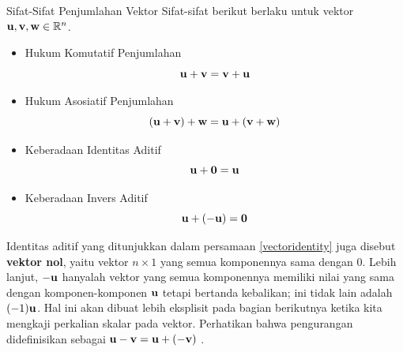 \begin{theorem}{Sifat-Sifat Penjumlahan Vektor}\label{thm:propertiesvectoraddition}
Sifat-sifat berikut berlaku untuk vektor $\mathbf{u},\mathbf{v}, \mathbf{w} \in \mathbb{R}^{n}$.
\begin{itemize}
\item Hukum Komutatif Penjumlahan
\begin{equation*}
\mathbf{u}+\mathbf{v}=\mathbf{v}+\mathbf{u}
\end{equation*}
\item Hukum Asosiatif Penjumlahan
\begin{equation*}
\left( \mathbf{u}+\mathbf{v}\right) +\mathbf{w}=\mathbf{u}+\left( \mathbf{v}+\mathbf{w}\right)
\end{equation*}
\item Keberadaan Identitas Aditif
\begin{equation}
\mathbf{u}+\mathbf{0}=\mathbf{u}
\label{vectoridentity}
\end{equation}
\item Keberadaan Invers Aditif
\begin{equation*}
\mathbf{u}+\left( -\mathbf{u}\right) =\mathbf{0}
\end{equation*}
\end{itemize}
\end{theorem}

Identitas aditif yang ditunjukkan dalam persamaan
\ref{vectoridentity} juga disebut \textbf{vektor nol},
yaitu vektor $n \times 1$ yang semua komponennya sama dengan $0$.
Lebih lanjut, $-\mathbf{u}$ hanyalah vektor yang semua komponennya memiliki
nilai yang sama dengan komponen-komponen $\mathbf{u}$ tetapi bertanda kebalikan; ini tidak lain adalah
$(-1)\mathbf{u}$. Hal ini akan dibuat lebih eksplisit pada bagian berikutnya
ketika kita mengkaji perkalian skalar pada vektor. Perhatikan bahwa pengurangan didefinisikan sebagai $\mathbf{u}-\mathbf{v} = \mathbf{u}+\left(
-\mathbf{v} \right)$ .
